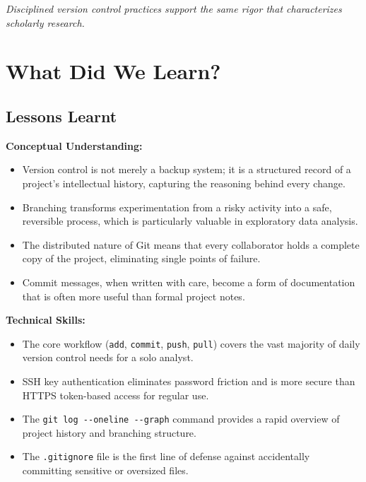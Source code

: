 \documentclass[
  letterpaper,
  DIV=11,
  numbers=noendperiod]{scrartcl}
\providecommand{\tightlist}{%
  \setlength{\itemsep}{0pt}\setlength{\parskip}{0pt}}
\begin{document}
\emph{Disciplined version control practices support the same rigor that
characterizes scholarly research.}

\section{What Did We Learn?}\label{what-did-we-learn}

\subsection{Lessons Learnt}\label{lessons-learnt}

\textbf{Conceptual Understanding:}

\begin{itemize}
\tightlist
\item
  Version control is not merely a backup system; it is a structured
  record of a project's intellectual history, capturing the reasoning
  behind every change.
\item
  Branching transforms experimentation from a risky activity into a
  safe, reversible process, which is particularly valuable in
  exploratory data analysis.
\item
  The distributed nature of Git means that every collaborator holds a
  complete copy of the project, eliminating single points of failure.
\item
  Commit messages, when written with care, become a form of
  documentation that is often more useful than formal project notes.
\end{itemize}

\textbf{Technical Skills:}

\begin{itemize}
\tightlist
\item
  The core workflow (\texttt{add}, \texttt{commit}, \texttt{push},
  \texttt{pull}) covers the vast majority of daily version control needs
  for a solo analyst.
\item
  SSH key authentication eliminates password friction and is more secure
  than HTTPS token-based access for regular use.
\item
  The \texttt{git\ log\ -\/-oneline\ -\/-graph} command provides a rapid
  overview of project history and branching structure.
\item
  The \texttt{.gitignore} file is the first line of defense against
  accidentally committing sensitive or oversized files.
\end{itemize}
\end{document}
